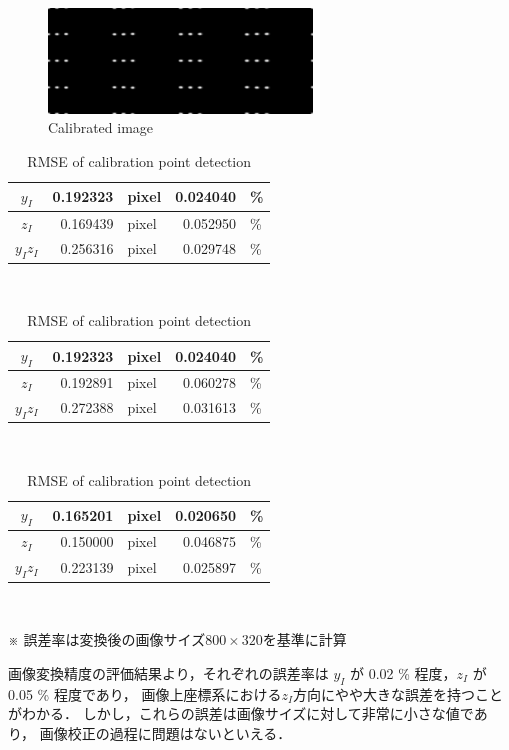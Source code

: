 \documentclass[twocolumn,a4j]{jsarticle}
\begin{document}
\begin{figure}[htbp]
  \centering
  \includegraphics[keepaspectratio, width=70mm]{../images/Calibration/0.bmp}
  \caption{Calibrated image}
\end{figure}

\begin{table}[hbtp]
  \centering
  \caption{RMSE of calibration point detection}
  {
    \begin{tabular}{c r l r l}
      \hline
      $y_I$    & 0.192323 & pixel & 0.024040 & \% \\ \hline
      $z_I$    & 0.169439 & pixel & 0.052950 & \% \\ \hline
      $y_Iz_I$ & 0.256316 & pixel & 0.029748 & \% \\ \hline
    \end{tabular}\\
     \baselineskip
    \begin{tabular}{c r l r l}
      \hline
      $y_I$    & 0.192323 & pixel & 0.024040 & \% \\ \hline
      $z_I$    & 0.192891 & pixel & 0.060278 & \% \\ \hline
      $y_Iz_I$ & 0.272388 & pixel & 0.031613 & \% \\ \hline
    \end{tabular}\\
     \baselineskip
    \begin{tabular}{c r l r l}
      \hline
      $y_I$    & 0.165201 & pixel & 0.020650 & \% \\ \hline
      $z_I$    & 0.150000 & pixel & 0.046875 & \% \\ \hline
      $y_Iz_I$ & 0.223139 & pixel & 0.025897 & \% \\ \hline
    \end{tabular}\\
  }
   \baselineskip
  ※ 誤差率は変換後の画像サイズ$800\times320$を基準に計算
\end{table}
\newpage
画像変換精度の評価結果より，それぞれの誤差率は
$y_I$ が 0.02 \% 程度，$z_I$ が 0.05 \% 程度であり，
画像上座標系における$z_I$方向にやや大きな誤差を持つことがわかる．
しかし，これらの誤差は画像サイズに対して非常に小さな値であり，
画像校正の過程に問題はないといえる．
\end{document}
